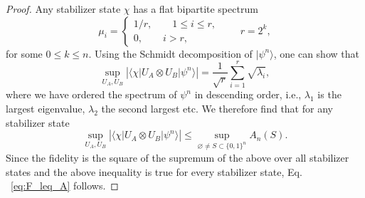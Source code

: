\documentclass[aps,pra,reprint,superscriptaddress]{revtex4-2}
\renewcommand\c{\chi}
\renewcommand\l{\lambda}
\newcommand\m{\mu}
\providecommand{\ket}[1]{\lvert #1\rangle}
\providecommand{\bra}[1]{\langle #1\rvert}
\theoremstyle{definition}
\theoremstyle{remark}
\begin{document}
    \begin{proof}
        Any stabilizer state $\chi$ has a flat bipartite spectrum \cite{Fattal:2004frh}
        \begin{equation}
            \m_i = \begin{cases}
                1/r,\qquad 1 \leq i \leq r,\\
                0,\qquad i > r,
            \end{cases}
            \qquad r = 2^{k},
        \end{equation}
        for some $0 \leq k \leq n$.
        Using the Schmidt decomposition of $\ket{\psi^n}$, one can show that \cite{Viscardi:2026oos}
        \begin{equation}
            \sup_{U_A,U_B} |\bra{\c}U_A \otimes U_B \ket{\psi^n}| =
            \frac{1}{\sqrt{r}} \sum_{i=1}^{r} \sqrt{\l_i},
        \end{equation}
        where we have ordered the spectrum of $\psi^n$ in descending order, i.e.,
        $\l_1$ is the largest eigenvalue, $\l_2$ the second largest etc.
        We therefore find that for any stabilizer state
        \begin{equation}\label{eq:upper_bound_fidelity}
            \sup_{U_A,U_B} |\bra{\c} U_A \otimes U_B \ket{\psi^n}| \leq
                    \sup_{\varnothing\neq S \subset \{0,1 \}^n} A_n(S).
        \end{equation}
        Since the fidelity is the square of the supremum of the above over all stabilizer states and the
        above inequality is true for every stabilizer state, Eq.
       ~\eqref{eq:F_leq_A} follows.
    \end{proof}
\end{document}
